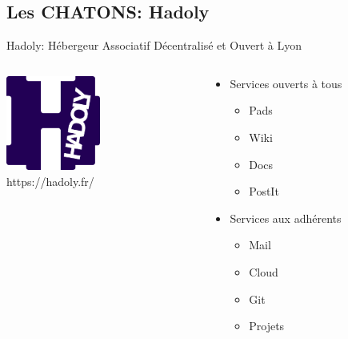 \subsection{Les CHATONS: Hadoly}

\begin{frame}{Hadoly: Hébergeur Associatif Décentralisé et Ouvert à Lyon}
  \begin{columns}
    \begin{column}{0.5\textwidth}
      \centering
      \includegraphics[width=0.5\textwidth]{un_autre_internet/hadoly.png}\\
      https://hadoly.fr/
    \end{column}
    \begin{column}{0.5\textwidth}
      \begin{itemize}
        \item Services ouverts à tous
        \begin{itemize}
            \item Pads
            \item Wiki
            \item Docs
            \item PostIt
        \end{itemize}
        \item Services aux adhérents
        \begin{itemize}
          \item Mail
          \item Cloud
          \item Git
          \item Projets
        \end{itemize}
      \end{itemize}
    \end{column}
  \end{columns}
\end{frame}

